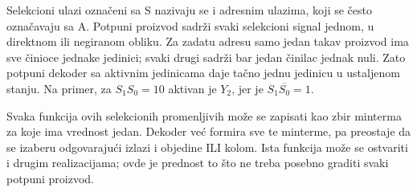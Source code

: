 
Selekcioni ulazi označeni sa S nazivaju se i adresnim ulazima, koji se često označavaju sa A. Potpuni proizvod sadrži svaki selekcioni signal jednom, u direktnom ili negiranom obliku. Za zadatu adresu samo jedan takav proizvod ima sve činioce jednake jedinici; svaki drugi sadrži bar jedan činilac jednak nuli. Zato potpuni dekoder sa aktivnim jedinicama daje tačno jednu jedinicu u ustaljenom stanju. Na primer, za \(S_1S_0=10\) aktivan je \(Y_2\), jer je \(S_1\overline{S_0}=1\).

Svaka funkcija ovih selekcionih promenljivih može se zapisati kao zbir minterma za koje ima vrednost jedan. Dekoder već formira sve te minterme, pa preostaje da se izaberu odgovarajući izlazi i objedine ILI kolom. Ista funkcija može se ostvariti i drugim realizacijama; ovde je prednost to što ne treba posebno graditi svaki potpuni proizvod.
